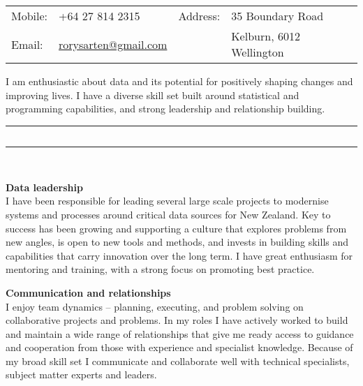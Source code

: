 \documentclass{article}[10pt] %
\newcommand{\heading}[1]{
	\vspace{22pt}
	\sectionline
	\subsection*{\color{titlecolour}\centering{#1}}	\sectionline \\
}
\newcommand{\sectionline}{%
  \vspace{-6pt}%
 {\centering\rule{\linewidth}{.7pt}}
  \vspace{-13pt}
}
\begin{document}
\thispagestyle{empty}



{}


\vspace{20pt}

\hspace{5.5em}
\begin{minipage}{1\textwidth }
\color{soft}
  \begin{tabular}{llll}
Mobile: & +64 27 814 2315  & \quad \quad Address: & 35 Boundary Road \\
Email: & \href{mailto:rorysarten@gmail.com}{rorysarten@gmail.com} & \quad \quad &  Kelburn, 6012 Wellington \\
  \end{tabular}
\end{minipage}

\vspace{8pt}
\raggedright


\begin{minipage}{1\textwidth }
I am enthusiastic about data and its potential for positively shaping changes and improving lives. I have a diverse skill set built around statistical and programming capabilities, and strong leadership and relationship building.

\end{minipage}
\vspace{1pt}

\vspace{-18pt}

\heading{Skills Profile}
\vspace{12pt}

{\bfseries \color{altcolour}Data leadership} 
\\I have been responsible for leading several large scale projects to modernise systems and processes around critical data sources for New Zealand. Key to success has been growing and supporting a culture that explores problems from new angles, is open to new tools and methods, and invests in building skills and capabilities that carry innovation over the long term. I have great enthusiasm for mentoring and training, with a strong focus on promoting best practice.\\
\vspace{10pt}

{\bfseries \color{altcolour}Communication and relationships} 
\\I enjoy team dynamics – planning, executing, and problem solving on collaborative projects and problems. In my roles I have actively worked to build and maintain a wide range of relationships that give me ready access to guidance and cooperation from those with experience and specialist knowledge. Because of my broad skill set I communicate and collaborate well with technical specialists, subject matter experts and leaders.\\
\vspace{10pt}
\end{document}
